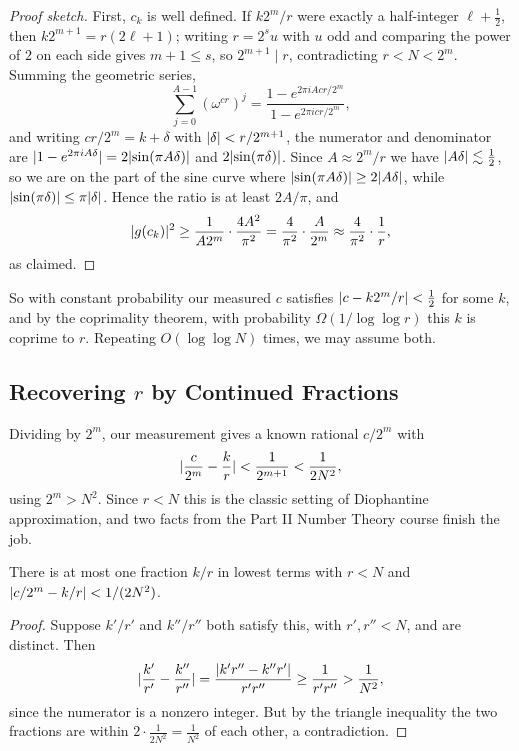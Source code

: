 \documentclass[a4paper]{scrartcl}
\begin{document}
\begin{proof}[Proof sketch]
	First, $c_k$ is well defined. If $k2^m/r$ were exactly a half-integer $\ell+\tfrac12$, then $k2^{m+1} = r(2\ell+1)$; writing $r = 2^su$ with $u$ odd and comparing the power of $2$ on each side gives $m+1 \le s$, so $2^{m+1}\mid r$, contradicting $r<N<2^m$. Summing the geometric series,
	$$\sum_{j=0}^{A-1}\left(\omega^{cr}\right)^j = \frac{1-e^{2\pi iAcr/2^m}}{1-e^{2\pi icr/2^m}},$$
	and writing $cr/2^m = k + \delta$ with $\lvert\delta\rvert< r/2^{m+1}$, the numerator and denominator are $\lvert1 - e^{2\pi iA\delta}\rvert = 2\lvert\sin(\pi A\delta)\rvert$ and $2\lvert\sin(\pi\delta)\rvert$. Since $A\approx 2^m/r$ we have $\lvert A\delta\rvert\lesssim\tfrac12$, so we are on the part of the sine curve where $\lvert\sin(\pi A\delta)\rvert\geq2\lvert A\delta\rvert$, while $\lvert\sin(\pi\delta)\rvert\leq\pi\lvert\delta\rvert$. Hence the ratio is at least $2A/\pi$, and
	$$\lvert g(c_k)\rvert^2\geq\frac{1}{A2^m}\cdot\frac{4A^2}{\pi^2} = \frac{4}{\pi^2}\cdot\frac{A}{2^m}\approx\frac{4}{\pi^2}\cdot\frac1r,$$
	as claimed.
\end{proof}

So with constant probability our measured $c$ satisfies $\lvert c - k2^m/r\rvert<\tfrac12$ for some $k$, and by the coprimality theorem, with probability $\Omega(1/\log\log r)$ this $k$ is coprime to $r$. Repeating $O(\log\log N)$ times, we may assume both.

\subsection{Recovering \texorpdfstring{$r$}{r} by Continued Fractions}

Dividing by $2^m$, our measurement gives a known rational $c/2^m$ with
$$\lvert\frac{c}{2^m}-\frac kr\rvert<\frac1{2^{m+1}}<\frac1{2N^2},$$
using $2^m>N^2$. Since $r<N$ this is the classic setting of Diophantine approximation, and two facts from the Part II Number Theory course finish the job.

\begin{lemma}
	There is at most one fraction $k/r$ in lowest terms with $r<N$ and $\lvert c/2^m - k/r\rvert<1/(2N^2)$.
\end{lemma}

\begin{proof}
	Suppose $k'/r'$ and $k''/r''$ both satisfy this, with $r',r''<N$, and are distinct. Then
	$$\lvert\frac{k'}{r'}-\frac{k''}{r''}\rvert = \frac{\lvert k'r''-k''r'\rvert}{r'r''}\geq\frac{1}{r'r''}>\frac1{N^2},$$
	since the numerator is a nonzero integer. But by the triangle inequality the two fractions are within $2\cdot\frac1{2N^2} = \frac1{N^2}$ of each other, a contradiction.
\end{proof}
\end{document}
